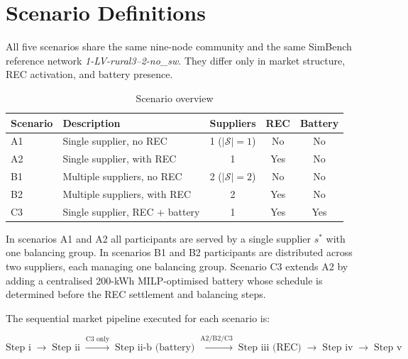 \documentclass[12pt,a4paper]{article}
\begin{document}
\section{Scenario Definitions}

All five scenarios share the same nine-node community and the same SimBench
reference network \textit{1-LV-rural3--2-no\_sw}.  They differ only in market
structure, REC activation, and battery presence.

\begin{table}[H]
\centering
\caption{Scenario overview}
\label{tab:scenarios}
\begin{tabular}{@{}llccc@{}}
\toprule
Scenario & Description & Suppliers & REC & Battery\\
\midrule
A1 & Single supplier, no REC          & 1 ($|\mathcal{S}|=1$) & No  & No \\
A2 & Single supplier, with REC        & 1                     & Yes & No \\
B1 & Multiple suppliers, no REC       & 2 ($|\mathcal{S}|=2$) & No  & No \\
B2 & Multiple suppliers, with REC     & 2                     & Yes & No \\
C3 & Single supplier, REC + battery   & 1                     & Yes & Yes\\
\bottomrule
\end{tabular}
\end{table}

\noindent
In scenarios A1 and A2 all participants are served by a single supplier
$s^{*}$ with one balancing group.  In scenarios B1 and B2 participants are
distributed across two suppliers, each managing one balancing group.  Scenario
C3 extends A2 by adding a centralised 200-kWh MILP-optimised battery whose
schedule is determined before the REC settlement and balancing steps.

The sequential market pipeline executed for each scenario is:

\begin{equation}
\text{Step~i} \;\rightarrow\; \text{Step~ii}
\;\xrightarrow{\text{C3 only}}\; \text{Step~ii-b (battery)}
\;\xrightarrow{\text{A2/B2/C3}}\; \text{Step~iii (REC)}
\;\rightarrow\; \text{Step~iv} \;\rightarrow\; \text{Step~v}
\label{eq:pipeline}
\end{equation}

\end{document}
